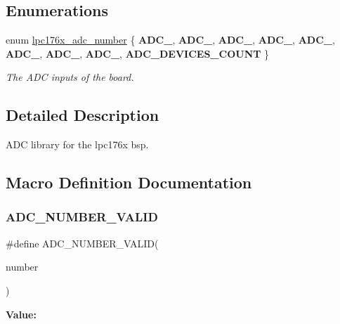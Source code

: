 \subsection*{Enumerations}
\begin{DoxyCompactItemize}
\item 
\mbox{\label{adc-defs_8h_ad59a4e78592b257fb62c09760e723e51}} 
enum \mbox{\hyperlink{adc-defs_8h_ad59a4e78592b257fb62c09760e723e51}{lpc176x\+\_\+adc\+\_\+number}} \{ \newline
{\bfseries A\+D\+C\+\_}, 
{\bfseries A\+D\+C\+\_}, 
{\bfseries A\+D\+C\+\_}, 
{\bfseries A\+D\+C\+\_}, 
\newline
{\bfseries A\+D\+C\+\_}, 
{\bfseries A\+D\+C\+\_}, 
{\bfseries A\+D\+C\+\_}, 
{\bfseries A\+D\+C\+\_}, 
\newline
{\bfseries A\+D\+C\+\_\+\+D\+E\+V\+I\+C\+E\+S\+\_\+\+C\+O\+U\+NT}
 \}
\begin{DoxyCompactList}\small\item\em The A\+DC inputs of the board. \end{DoxyCompactList}\end{DoxyCompactItemize}


\subsection{Detailed Description}
A\+DC library for the lpc176x bsp. 



\subsection{Macro Definition Documentation}
\mbox{\label{adc-defs_8h_aef844b98ba6730f1fc4a54048a224bd9}} 
\subsubsection{\texorpdfstring{ADC\_NUMBER\_VALID}{ADC\_NUMBER\_VALID}}
{\footnotesize\ttfamily \#define A\+D\+C\+\_\+\+N\+U\+M\+B\+E\+R\+\_\+\+V\+A\+L\+ID(\begin{DoxyParamCaption}\item[{}]{number }\end{DoxyParamCaption})}

{\bfseries Value\+:}
\begin{DoxyCode}{0}

\end{DoxyCode}

